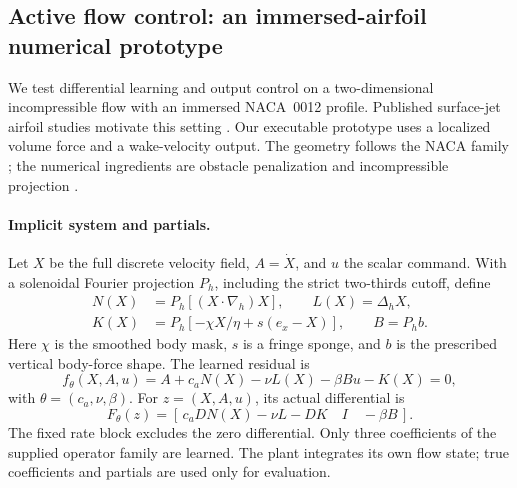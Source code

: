 \subsection{Active flow control: an immersed-airfoil numerical prototype}
\label{sec:afc_prototype}

We test differential learning and output control on a two-dimensional
incompressible flow with an immersed NACA~0012 profile. Published surface-jet
airfoil studies motivate this setting \cite{Garcia2025Airfoil,Montala2025Wing}.
Our executable prototype uses a localized volume force and a wake-velocity
output. The geometry follows the NACA family \cite{Jacobs1933NACA}; the
numerical ingredients are obstacle penalization and incompressible projection
\cite{Angot1999Penalization,Chorin1968Projection}.

\paragraph{Implicit system and partials.}
Let $X$ be the full discrete velocity field, $A=\dot X$, and $u$ the scalar
command. With a solenoidal Fourier projection $P_h$, including the strict
two-thirds cutoff, define
\begin{align}
 N(X)&=P_h[(X\cdot\nabla_h)X],\qquad L(X)=\Delta_hX,\nonumber\\
 K(X)&=P_h[-\chi X/\eta+s(e_x-X)],\qquad B=P_hb.
 \label{eq:afc_short_operators}
\end{align}
Here $\chi$ is the smoothed body mask, $s$ is a fringe sponge, and $b$ is
the prescribed vertical body-force shape. The learned residual is
\begin{equation}
 f_\theta(X,A,u)=A+c_aN(X)-\nu L(X)-\beta Bu-K(X)=0,
 \label{eq:afc_short_f}
\end{equation}
with $\theta=(c_a,\nu,\beta)$. For $z=(X,A,u)$, its actual differential is
\begin{equation}
 F_\theta(z)=
 [\,c_aDN(X)-\nu L-DK\quad I\quad-\beta B\,].
 \label{eq:afc_short_F}
\end{equation}
The fixed rate block excludes the zero differential. Only three coefficients
of the supplied operator family are learned. The plant integrates its own
flow state; true coefficients and partials are used only for evaluation.

